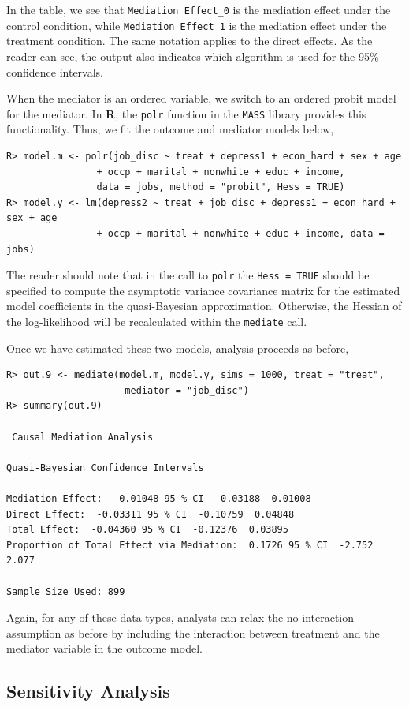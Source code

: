 \documentclass[11pt,letterpaper]{article}
\theoremstyle{plain}
\newcommand\bR{{\bf R}}
\begin{document}
\noindent In the table, we see that \texttt{Mediation Effect\_0} is
the mediation effect under the control condition, while
\texttt{Mediation Effect\_1} is the mediation effect under the
treatment condition.  The same notation applies to the direct effects.
As the reader can see, the output also indicates which algorithm is
used for the 95\% confidence intervals.

When the mediator is an ordered variable, we switch to an ordered
probit model for the mediator.  In \bR, the \texttt{polr} function
in the \texttt{MASS} library provides this functionality.  Thus, we
fit the outcome and mediator models below,
\begin{verbatim}
R> model.m <- polr(job_disc ~ treat + depress1 + econ_hard + sex + age 
                + occp + marital + nonwhite + educ + income, 
                data = jobs, method = "probit", Hess = TRUE)
R> model.y <- lm(depress2 ~ treat + job_disc + depress1 + econ_hard + sex + age 
                + occp + marital + nonwhite + educ + income, data = jobs)
\end{verbatim}
The reader should note that in the call to \texttt{polr} the
\texttt{Hess = TRUE} should be specified to compute the asymptotic variance
covariance matrix for the estimated model coefficients in the quasi-Bayesian
approximation.  Otherwise, the Hessian of the log-likelihood will be recalculated
within the {\tt mediate} call.  

Once we have estimated these two models, analysis proceeds as before,
\begin{verbatim}
R> out.9 <- mediate(model.m, model.y, sims = 1000, treat = "treat",
                     mediator = "job_disc")
R> summary(out.9)

 Causal Mediation Analysis 

Quasi-Bayesian Confidence Intervals

Mediation Effect:  -0.01048 95 % CI  -0.03188  0.01008 
Direct Effect:  -0.03311 95 % CI  -0.10759  0.04848 
Total Effect:  -0.04360 95 % CI  -0.12376  0.03895 
Proportion of Total Effect via Mediation:  0.1726 95 % CI  -2.752  2.077 

Sample Size Used: 899 
\end{verbatim}
Again, for any of these data types, analysts can relax the
no-interaction assumption as before by including the interaction
between treatment and the mediator variable in the outcome model.

\subsection{Sensitivity Analysis}
\end{document}
